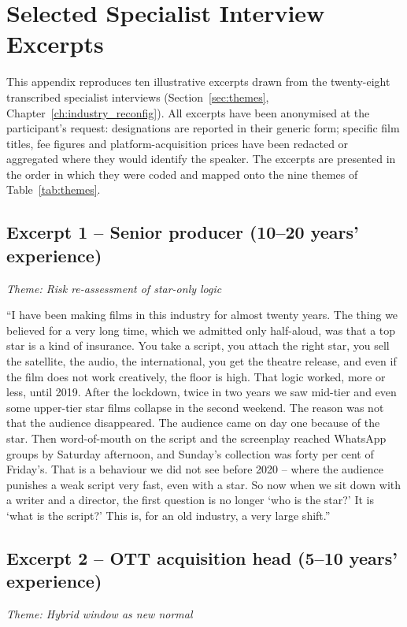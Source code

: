 \chapter{Selected Specialist Interview Excerpts}
\label{app:interviews}

\noindent
This appendix reproduces ten illustrative excerpts drawn from the
twenty-eight transcribed specialist interviews
(Section~\ref{sec:themes}, Chapter~\ref{ch:industry_reconfig}).  All
excerpts have been anonymised at the participant's request:
designations are reported in their generic form; specific film
titles, fee figures and platform-acquisition prices have been
redacted or aggregated where they would identify the speaker.  The
excerpts are presented in the order in which they were coded and
mapped onto the nine themes of Table~\ref{tab:themes}.

\section*{Excerpt 1 -- Senior producer (10--20 years' experience)}
\textit{Theme: Risk re-assessment of star-only logic}
\medskip

``I have been making films in this industry for almost twenty years.
The thing we believed for a very long time, which we admitted only
half-aloud, was that a top star is a kind of insurance.  You take a
script, you attach the right star, you sell the satellite, the
audio, the international, you get the theatre release, and even if
the film does not work creatively, the floor is high.  That logic
worked, more or less, until 2019.  After the lockdown, twice in
two years we saw mid-tier and even some upper-tier star films
collapse in the second weekend.  The reason was not that the
audience disappeared.  The audience came on day one because of the
star.  Then word-of-mouth on the script and the screenplay reached
WhatsApp groups by Saturday afternoon, and Sunday's collection was
forty per cent of Friday's.  That is a behaviour we did not see
before 2020 -- where the audience punishes a weak script very fast,
even with a star.  So now when we sit down with a writer and a
director, the first question is no longer `who is the star?'  It is
`what is the script?'  This is, for an old industry, a very large
shift.''

\section*{Excerpt 2 -- OTT acquisition head (5--10 years' experience)}
\textit{Theme: Hybrid window as new normal}
\medskip

